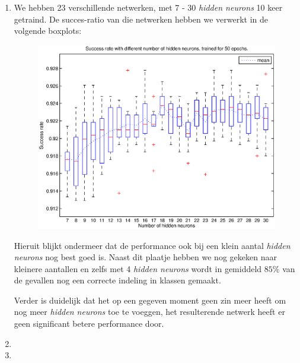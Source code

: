 \documentclass[a4paper,10pt,fleqn]{article}
\begin{document}
\begin{enumerate}[1.]
	\item We hebben 23 verschillende netwerken, met 7 - 30 \textit{hidden neurons} 10 keer getraind. De succes-ratio van die netwerken hebben we verwerkt in de volgende boxplots:
    \begin{figure}[!ht]
    	\centering
        \includegraphics[width=.9\textwidth]{images/error-boxplot}
    \end{figure}
    Hieruit blijkt ondermeer dat de performance ook bij een klein aantal \textit{hidden neurons} nog best goed is. Naast dit plaatje hebben we nog gekeken naar kleinere aantallen en zelfs met 4 \textit{hidden neurons} wordt in gemiddeld $85\%$ van de gevallen nog een correcte indeling in klassen gemaakt.

    Verder is duidelijk dat het op een gegeven moment geen zin meer heeft om nog meer \textit{hidden neurons} toe te voeggen, het resulterende netwerk heeft er geen significant betere performance door.


	\item

	\item


\end{enumerate}
\end{document}

